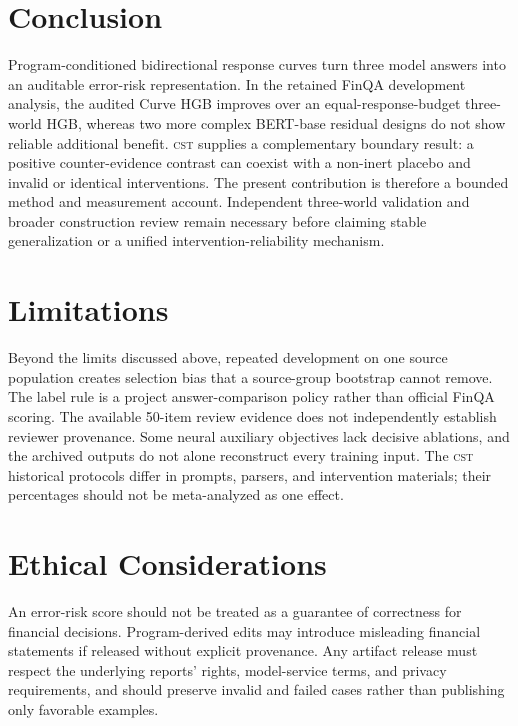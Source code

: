\documentclass[11pt]{article}
\newcommand{\CST}{\textsc{cst}}
\begin{document}
\section{Conclusion}
Program-conditioned bidirectional response curves turn three model answers into an auditable error-risk representation. In the retained FinQA development analysis, the audited Curve HGB improves over an equal-response-budget three-world HGB, whereas two more complex BERT-base residual designs do not show reliable additional benefit. \CST{} supplies a complementary boundary result: a positive counter-evidence contrast can coexist with a non-inert placebo and invalid or identical interventions. The present contribution is therefore a bounded method and measurement account. Independent three-world validation and broader construction review remain necessary before claiming stable generalization or a unified intervention-reliability mechanism.

\section*{Limitations}
Beyond the limits discussed above, repeated development on one source population creates selection bias that a source-group bootstrap cannot remove. The label rule is a project answer-comparison policy rather than official FinQA scoring. The available 50-item review evidence does not independently establish reviewer provenance. Some neural auxiliary objectives lack decisive ablations, and the archived outputs do not alone reconstruct every training input. The \CST{} historical protocols differ in prompts, parsers, and intervention materials; their percentages should not be meta-analyzed as one effect.

\section*{Ethical Considerations}
An error-risk score should not be treated as a guarantee of correctness for financial decisions. Program-derived edits may introduce misleading financial statements if released without explicit provenance. Any artifact release must respect the underlying reports' rights, model-service terms, and privacy requirements, and should preserve invalid and failed cases rather than publishing only favorable examples.



\end{document}
